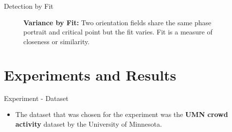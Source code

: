 \documentclass{beamer}
\begin{document}
\begin{frame}{Detection by Fit}
\begin{figure}[h!]
\begin{subfigure}[t]{.25\textwidth}
	\end{subfigure}
	
	\caption{\textbf{Variance by Fit:} Two orientation fields share the same phase portrait and critical point but the fit varies. Fit is a measure of closeness or similarity.  }
	\label{fit_vary}
\end{figure}

\end{frame}




\section{Experiments and Results}


\begin{frame}{Experiment - Dataset}
\begin{itemize}
\item The dataset that was chosen for the experiment was the \textbf{UMN crowd activity}\cite{umn_crowd} dataset by the University of Minnesota.



\end{itemize}
\end{frame}
\end{document}
